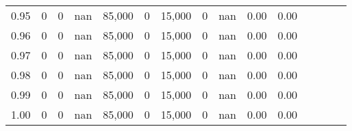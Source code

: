 \begin{tabular}{rrrcrrrrrrrrrrr}
0.95 &      0 &    0 &                                        nan &  85,000 &       0 &  15,000 &       0 &   nan &  0.00 &                         0.00 \\
0.96 &      0 &    0 &                                        nan &  85,000 &       0 &  15,000 &       0 &   nan &  0.00 &                         0.00 \\
0.97 &      0 &    0 &                                        nan &  85,000 &       0 &  15,000 &       0 &   nan &  0.00 &                         0.00 \\
0.98 &      0 &    0 &                                        nan &  85,000 &       0 &  15,000 &       0 &   nan &  0.00 &                         0.00 \\
0.99 &      0 &    0 &                                        nan &  85,000 &       0 &  15,000 &       0 &   nan &  0.00 &                         0.00 \\
1.00 &      0 &    0 &                                        nan &  85,000 &       0 &  15,000 &       0 &   nan &  0.00 &                         0.00 \\
\bottomrule
\end{tabular}
